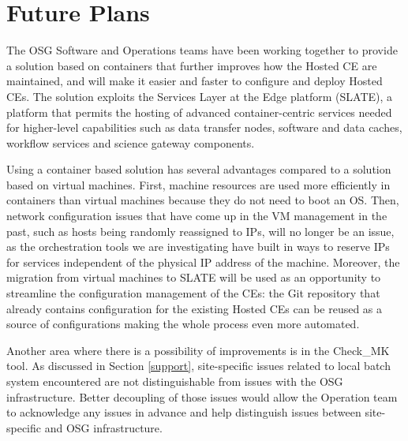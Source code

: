 \documentclass{webofc}
\begin{document}
\section{Future Plans}
\label{future}


The OSG Software and Operations teams have been working together to provide a solution based on containers that further improves how the Hosted CE are maintained, and will make it easier and faster to configure and deploy Hosted CEs. The solution exploits the Services Layer at the Edge platform \cite{SLATE} (SLATE), a platform that permits the hosting of advanced container-centric services needed for higher-level capabilities such as data transfer nodes, software and data caches, workflow services and science gateway components.

Using a container based solution has several advantages compared to a solution based on virtual machines. First, machine resources are used more efficiently in containers than virtual machines because they do not need to boot an OS. Then, network configuration issues that have come up in the VM management in the past, such as hosts being randomly reassigned to IPs, will no longer be an issue, as the orchestration tools we are investigating have built in ways to reserve IPs for services independent of the physical IP address of the machine. Moreover, the migration from virtual machines to SLATE will be used as an opportunity to streamline the configuration management of the CEs: the Git repository that already contains configuration for the existing Hosted CEs can be reused as a source of configurations making the  whole process even more automated.

Another area where there is a possibility of improvements is in the Check\_MK tool. As discussed in Section \ref{support}, site-specific issues related to local batch system encountered are not distinguishable from issues with the OSG infrastructure. Better decoupling of those issues would allow the Operation team  to acknowledge any issues in advance and help distinguish issues between site-specific and OSG infrastructure.
\end{document}
